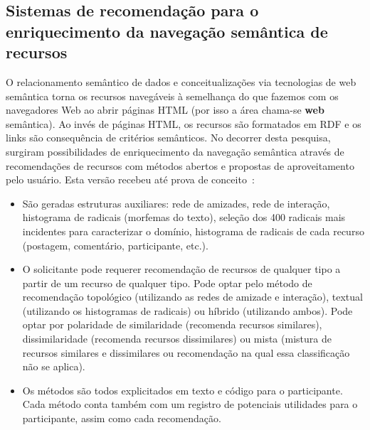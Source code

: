 \documentclass[a4paper,openright,12pt]{report} %
\begin{document}
\subsection{Sistemas de recomendação para o enriquecimento da navegação semântica de recursos}
O relacionamento semântico de dados e conceitualizações via tecnologias de web semântica 
torna os recursos navegáveis à semelhança do que fazemos com os navegadores Web
ao abrir páginas HTML (por isso a área chama-se {\bf web} semântica).
Ao invés de páginas HTML, os recursos são formatados em RDF e os links são
consequência de critérios semânticos.
No decorrer desta pesquisa, surgiram possibilidades de enriquecimento
da navegação semântica através de recomendações de recursos com
métodos abertos e propostas de aproveitamento pelo usuário.
Esta versão recebeu até prova de conceito~\cite{pnud4}:
\begin{itemize}
    \item São geradas estruturas auxiliares: rede de amizades, rede de interação, histograma de radicais (morfemas do texto),
        seleção dos 400 radicais
        mais incidentes para caracterizar o domínio,
        histograma de radicais de cada recurso 
        (postagem, comentário, participante, etc.).
    \item O solicitante pode requerer recomendação de recursos
        de qualquer tipo a partir de um recurso de qualquer
        tipo. Pode optar pelo método de recomendação topológico (utilizando as redes de amizade e interação),
        textual (utilizando os histogramas de radicais) ou híbrido (utilizando ambos).
        Pode optar por polaridade de similaridade (recomenda recursos similares),
        dissimilaridade (recomenda recursos dissimilares) ou
        mista (mistura de recursos similares e dissimilares ou recomendação na qual essa classificação não se aplica).
    \item Os métodos são todos explicitados em texto e código
        para o participante. Cada método conta também com um
        registro de potenciais utilidades para o participante,
        assim como cada recomendação.
\end{itemize}
\end{document}
